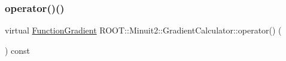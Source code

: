 \subsubsection{\texorpdfstring{operator()()}{operator()()}\hspace{0.1cm}{\footnotesize\ttfamily [2/6]}}
{\footnotesize\ttfamily virtual \mbox{\hyperlink{classROOT_1_1Minuit2_1_1FunctionGradient}{Function\+Gradient}} R\+O\+O\+T\+::\+Minuit2\+::\+Gradient\+Calculator\+::operator() (\begin{DoxyParamCaption}\item[{const \mbox{\hyperlink{classROOT_1_1Minuit2_1_1MinimumParameters}{Minimum\+Parameters}} \&}]{ }\end{DoxyParamCaption}) const\hspace{0.3cm}{\ttfamily [pure virtual]}}



